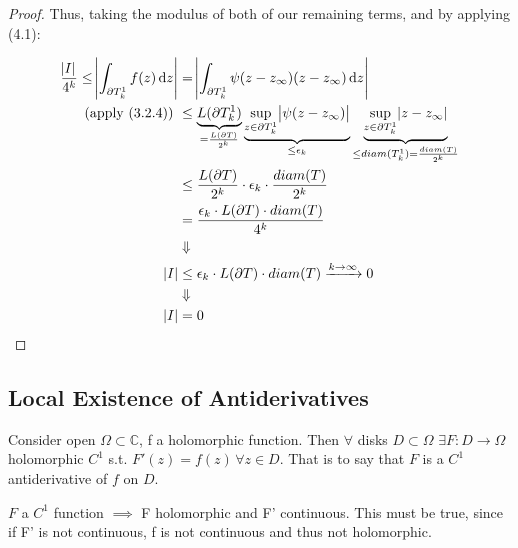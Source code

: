 \begin{proof}
Thus, taking the modulus of both of our remaining terms, and by applying (4.1):

\begin{align*}
    \frac{\abs{I}}{4^k} \leq \abs{\int_{\partial T_k^1} f(z)  \dif z} &= \abs{\int_{\partial T_k^1} \psi(z-z_\infty)(z-z_\infty)  \dif z}\\
    \text{(apply (3.2.4)) } &\leq \underbrace{L(\partial T_k^1)}_{=\frac{L(\partial T)}{2^k}} \underbrace{\sup\limits_{z\in \partial T_k^1}  \abs{\psi(z-z_\infty) }  }_{\leq \epsilon_k}   \underbrace{\sup\limits_{z\in \partial T_k^1} \abs{z-z_\infty}}_{\leq diam(T_k^1) = \frac{diam(T)}{2^k}} \\
    &\leq \frac{L(\partial T)}{2^k} \cdot \epsilon_k \cdot \frac{diam(T)}{2^k}\\
    &= \frac{\epsilon_k \cdot L(\partial T) \cdot diam(T) }{4^k}\\
    &\Downarrow\\
    \abs{I} & \leq \epsilon_k \cdot L(\partial T) \cdot diam(T) \xrightarrow[]{k\rightarrow \infty} 0\\
    &\Downarrow\\
    \abs{I} &= 0\\
\end{align*}

\end{proof}


\subsection{Local Existence of Antiderivatives}


\begin{corollary}
Consider open $\Omega \subset \mathbb{C}$, f a holomorphic function. Then $\forall$ disks $D\subset \Omega$ $\exists F:D\rightarrow \Omega$ holomorphic $C^1$ s.t. $F'(z)=f(z) \, \forall z\in D$. That is to say that $F$ is a $C^1$ antiderivative of $f$ on $D$.
\end{corollary}

\begin{note}
$F$ a $C^1$ function $\implies$ F holomorphic and F' continuous. This must be true, since if F' is not continuous, f is not continuous and thus not holomorphic.
\end{note}



